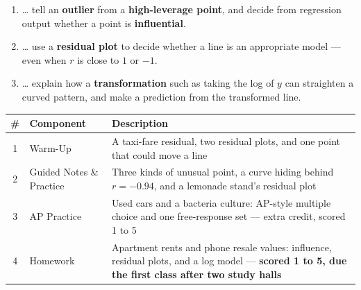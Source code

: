 \documentclass[12pt]{article}
\begin{document}

\namedateperiod
\vspace{0.18in}

\boxguard[14]
\begin{learningtargetbox}
\small
\begin{enumerate}[leftmargin=1.5em, itemsep=5pt]
  \item \ldots{} tell an \textbf{outlier} from a \textbf{high-leverage point}, and decide from
        regression output whether a point is \textbf{influential}.
  \item \ldots{} use a \textbf{residual plot} to decide whether a line is an appropriate model
        --- even when $r$ is close to $1$ or $-1$.
  \item \ldots{} explain how a \textbf{transformation} such as taking the log of $y$ can
        straighten a curved pattern, and make a prediction from the transformed line.
\end{enumerate}
\end{learningtargetbox}

\vspace{0.14in}

\boxguard[14]
\begin{tocbox}
\small
\renewcommand{\arraystretch}{1.5}
\begin{tabularx}{\linewidth}{@{} c l X @{}}
\rowcolor{sky}
\textbf{\#} & \textbf{Component} & \textbf{Description} \\
\midrule
1 & Warm-Up & A taxi-fare residual, two residual plots, and one point that could move a line \\
2 & Guided Notes \& Practice & Three kinds of unusual point, a curve hiding behind
                 $r = -0.94$, and a lemonade stand's residual plot \\
3 & AP Practice & Used cars and a bacteria culture: AP-style multiple choice and one
                 free-response set --- extra credit, scored 1 to 5 \\
4 & Homework & Apartment rents and phone resale values: influence, residual plots, and a log
                 model --- \textbf{scored 1 to 5, due the first class after two study halls} \\
\end{tabularx}
\end{tocbox}
\end{document}
